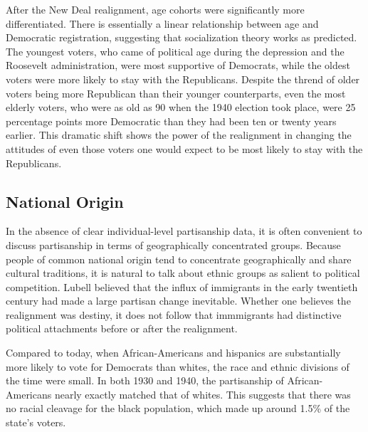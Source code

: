 \documentclass[11pt]{scrartcl}\usepackage[]{graphicx}\usepackage[]{color}
\begin{document}
After the New Deal realignment, age cohorts were significantly more differentiated. There is essentially a linear relationship between age and Democratic registration, suggesting that socialization theory works as predicted. The youngest voters, who came of political age during the depression and the Roosevelt administration, were most supportive of Democrats, while the oldest voters were more likely to stay with the Republicans. Despite the thrend of older voters being more Republican than their younger counterparts, even the most elderly voters, who were as old as 90 when the 1940 election took place, were 25 percentage points more Democratic than they had been ten or twenty years earlier.  This dramatic shift shows the power of the realignment in changing the attitudes of even those voters one would expect to be most likely to stay with the Republicans.


\subsection*{National Origin}


In the absence of clear individual-level partisanship data, it is often convenient to discuss partisanship in terms of geographically concentrated groups. Because people of common national origin tend to concentrate geographically and share cultural traditions, it is natural to talk about ethnic groups as salient to political competition. Lubell \citeyearpar{lubell1952future} believed that the influx of immigrants in the early twentieth century had made a large partisan change inevitable. Whether one believes the realignment was destiny, it does not  follow that immmigrants had distinctive political attachments before or after the realignment.

Compared to today, when African-Americans and hispanics are substantially more likely to vote for Democrats than  whites, the race and ethnic divisions of the time were small.  In both 1930 and 1940, the partisanship of African-Americans nearly exactly matched that of whites. This suggests that there was no racial cleavage for the black population, which made up around 1.5\% of the state's voters. 
\end{document}
